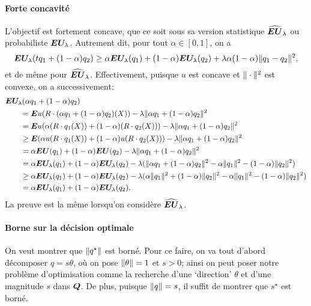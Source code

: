 \paragraph{Forte concavité}

L'objectif est fortement concave, que ce soit sous sa version statistique $\widehat{\bm{EU}}_\lambda$ ou
probabiliste $\bm{EU}_\lambda$. Autrement dit, pour tout $\alpha \in [0,1]$, on a
\begin{equation}
  \bm{EU}_\lambda(tq_1 + (1-\alpha )q_2) \geq \alpha \bm{EU}_\lambda(q_1) + (1-\alpha)\bm{EU}_\lambda(q_2) + \lambda \alpha(1-\alpha)\|q_1-q_2\|^2,
\end{equation}
et de même pour $\widehat{\bm{EU}}_\lambda$. Effectivement, puisque $u$ est concave et $\|\cdot\|^2$ est
convexe, on a successivement:
\begin{align}
  & \bm{EU}_\lambda(\alpha q_1 + (1-\alpha )q_2)\\
  &\qquad= \bm E u(R\cdot (\alpha q_1+(1-\alpha )q_2)(X)) - \lambda\|\alpha q_1 + (1-\alpha)q_2\|^2\\
  &\qquad= \bm E u(\alpha (R\cdot q_1(X)) + (1-\alpha )(R\cdot q_2(X)))- \lambda\|\alpha q_1 + (1-\alpha)q_2\|^2\\
  &\qquad\geq \bm E(\alpha  u(R\cdot q_1(X)) + (1-\alpha )u(R\cdot q_2(X))) - \lambda\|\alpha q_1 + (1-\alpha)q_2\|^2\\
  &\qquad= \alpha\bm{EU}(q_1) + (1-\alpha)\bm{EU}(q_2) - \lambda\|\alpha q_1 + (1-\alpha)q_2\|^2\\
  &\qquad= \alpha\bm{EU}_\lambda(q_1) + (1-\alpha)\bm{EU}_\lambda(q_2) - \lambda(\|\alpha q_1+(1-\alpha)q_2\|^2 - \alpha\|q_1\|^2 -
    (1-\alpha)\|q_2\|^2)\\
  &\qquad \geq \alpha\bm{EU}_\lambda(q_1) + (1-\alpha)\bm{EU}_\lambda(q_2) -\lambda(\alpha\|q_1\|^2 + (1-\alpha)\|q_2\|^2 - \alpha\|q_1\|^2 -
    (1-\alpha)\|q_2\|^2)\\
  &\qquad = \alpha\bm{EU}_\lambda(q_1) + (1-\alpha)\bm{EU}_\lambda(q_2).
\end{align}
La preuve est la même lorsqu'on considère $\widehat{\bm{EU}}_\lambda$.


\paragraph{Borne sur la décision optimale}

On veut montrer que $\|q^\star\|$ est borné. Pour ce faire, on va tout d'abord décomposer
$q = s\theta$, où on pose $\|\theta\|=1$ et $s>0$; ainsi on peut poser notre problème
d'optimisation comme la recherche d'une `direction' $\theta$ et d'une magnitude $s$ dans
$\bm Q$. De plus, puisque $\|q\| = s$, il suffit de montrer que $s^\star$ est borné.

